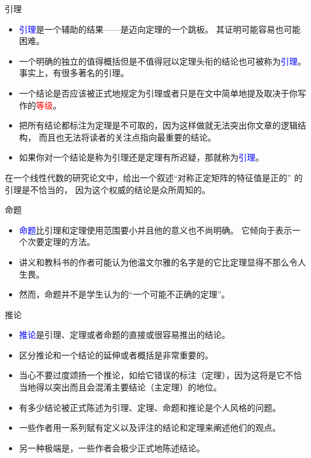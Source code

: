 \documentclass[13pt]{ctexbeamer}
\newcommand{\red}[1]{\textcolor{red}{#1}}
\newcommand{\blue}[1]{\textcolor{blue}{#1}}
\begin{document}
\begin{frame}{引理}

\begin{itemize}
	\item
	\blue{引理}是一个辅助的结果——是迈向定理的一个跳板。
	其证明可能容易也可能困难。

\item 一个明确的独立的值得概括但是不值得冠以定理头衔的结论也可被称为\blue{引理}。
事实上，有很多著名的引理。
\item
	一个结论是否应该被正式地规定为引理或者只是在文中简单地提及取决于你写作的\red{等级}。
\item
\alert{把所有结论都标注为定理是不可取的}，因为这样做就无法突出你文章的逻辑结构，
而且也无法将读者的关注点指向最重要的结论。
\item 如果你对一个结论是称为引理还是定理有所迟疑，那就称为\blue{引理}。
\end{itemize}


在一个线性代数的研究论文中，给出一个叙述``对称正定矩阵的特征值是正的'' 的引理是不恰当的，
因为这个权威的结论是众所周知的。

\end{frame}


\begin{frame}{命题}
\begin{itemize}
	\item
\blue{命题}比引理和定理使用范围要小并且他的意义也不尚明确。
它倾向于表示一个次要定理的方法。
\item 讲义和教科书的作者可能认为他温文尔雅的名字是的它比定理显得不那么令人生畏。
 \item 然而，命题并不是学生认为的“一个可能不正确的定理”。
\end{itemize}
\end{frame}

\begin{frame}{推论}
\begin{itemize}
\item \blue{推论}是引理、定理或者命题的直接或很容易推出的结论。
\item 区分推论和一个结论的延伸或者概括是非常重要的。
\item 当心不要过度颂扬一个推论，如给它错误的标注（定理），因为这将是它不恰当地得以突出而且会混淆主要结论（主定理）的地位。
\end{itemize}
\end{frame}

\begin{frame}
\begin{itemize}
\item 有多少结论被正式陈述为引理、定理、命题和推论是个人风格的问题。
\item 一些作者用一系列赋有定义以及评注的结论和定理来阐述他们的观点。
\item 另一种极端是，一些作者会极少正式地陈述结论。
\end{itemize}
\end{frame}
\end{document}
